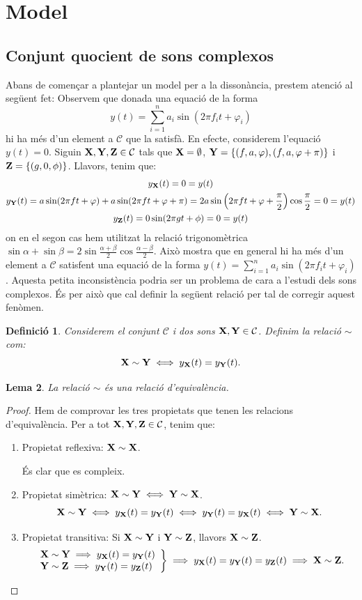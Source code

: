 \documentclass{article}
\theoremstyle{math}
\newtheorem{definition}{Definició}[section]
\newtheorem{lemma}[definition]{Lema}
\newcommand{\0}{\ensuremath{\vb{0}}}
\newcommand{\X}{\ensuremath{\vb{X}}}
\newcommand{\Y}{\ensuremath{\vb{Y}}}
\newcommand{\Z}{\ensuremath{\vb{Z}}}
\begin{document}
\section{Model}\label{model}
\subsection{Conjunt quocient de sons complexos}
Abans de començar a plantejar un model per a la dissonància, prestem atenció al següent fet: Observem que donada una equació de la forma $$y(t)=\sum_{i=1}^na_i\sin(2\pi f_it+\varphi_i)$$ hi ha més d'un element a $\mathcal{C}$ que la satisfà. En efecte, considerem l'equació $y(t)=0$. Siguin $\X,\Y,\Z\in\mathcal{C}$ tals que $\X=\emptyset$, $\Y=\{(f,a,\varphi),(f,a,\varphi+\pi)\}$ i $\Z=\{(g,0,\phi)\}$. Llavors, tenim que:
\begin{gather*}
    y_{\X}(t)=0=y(t)\\
    y_{\Y}(t)=a\sin(2\pi ft+\varphi)+a\sin(2\pi ft+\varphi+\pi)=2a\sin\left(2\pi ft+\varphi +\frac{\pi}{2}\right)\cos\frac{\pi}{2}=0=y(t)\\
    y_{\Z}(t)=0\sin(2\pi gt+\phi)=0=y(t)
\end{gather*}
on en el segon cas hem utilitzat la relació trigonomètrica $\sin\alpha+\sin\beta=2\sin\frac{\alpha+\beta}{2}\cos\frac{\alpha-\beta}{2}$. Això mostra que en general hi ha més d'un element a $\mathcal{C}$ satisfent una equació de la forma $y(t)=\sum_{i=1}^na_i\sin(2\pi f_it+\varphi_i)$. Aquesta petita inconsistència podria ser un problema de cara a l'estudi dels sons complexos. És per això que cal definir la següent relació per tal de corregir aquest fenòmen.
\begin{definition}
    Considerem el conjunt $\mathcal{C}$ i dos sons $\X,\Y\in\mathcal{C}$. Definim la relació $\sim$ com: $$\X\sim \Y\iff y_{\X}(t)=y_{\Y}(t).$$
\end{definition}
\begin{lemma}
    La relació $\sim$ és una relació d'equivalència.
\end{lemma}
\begin{proof}
    Hem de comprovar les tres propietats que tenen les relacions d'equivalència. Per a tot $\X,\Y,\Z\in\mathcal{C}$, tenim que:
    \begin{enumerate}
        \item Propietat reflexiva: $\X\sim \X$.\par És clar que es compleix.
        \item Propietat simètrica: $\X\sim \Y\iff \Y\sim \X$.
        $$\X\sim \Y\iff y_{\X}(t)=y_{\Y}(t)\iff y_{\Y}(t)=y_{\X}(t)\iff \Y\sim \X.$$
        \item Propietat transitiva: Si $\X\sim \Y$ i $\Y\sim \Z$, llavors $\X\sim \Z$.
            $$\left.
            \begin{array}{l}
                \X\sim \Y\implies y_{\X}(t)=y_{\Y}(t)\\
                \Y\sim \Z\implies y_{\Y}(t)=y_{\Z}(t)
            \end{array}\right\}\implies y_{\X}(t)=y_{\Y}(t)=y_{\Z}(t)\implies \X\sim \Z.$$
    \end{enumerate}
\end{proof}
\end{document}
